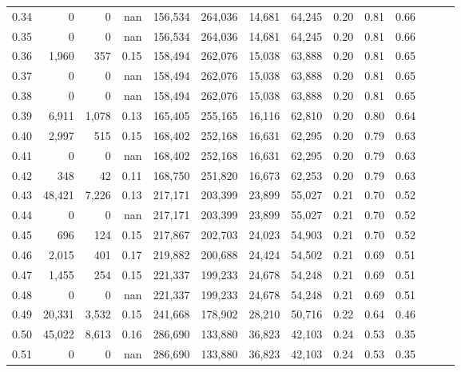 \begin{tabular}{rrrrrrrrrrrrrr}
0.34 &       0 &      0 &   nan &  156,534 &  264,036 &  14,681 &  64,245 &  0.20 &  0.81 &      0.66 \\
0.35 &       0 &      0 &   nan &  156,534 &  264,036 &  14,681 &  64,245 &  0.20 &  0.81 &      0.66 \\
0.36 &   1,960 &    357 &  0.15 &  158,494 &  262,076 &  15,038 &  63,888 &  0.20 &  0.81 &      0.65 \\
0.37 &       0 &      0 &   nan &  158,494 &  262,076 &  15,038 &  63,888 &  0.20 &  0.81 &      0.65 \\
0.38 &       0 &      0 &   nan &  158,494 &  262,076 &  15,038 &  63,888 &  0.20 &  0.81 &      0.65 \\
0.39 &   6,911 &  1,078 &  0.13 &  165,405 &  255,165 &  16,116 &  62,810 &  0.20 &  0.80 &      0.64 \\
0.40 &   2,997 &    515 &  0.15 &  168,402 &  252,168 &  16,631 &  62,295 &  0.20 &  0.79 &      0.63 \\
0.41 &       0 &      0 &   nan &  168,402 &  252,168 &  16,631 &  62,295 &  0.20 &  0.79 &      0.63 \\
0.42 &     348 &     42 &  0.11 &  168,750 &  251,820 &  16,673 &  62,253 &  0.20 &  0.79 &      0.63 \\
0.43 &  48,421 &  7,226 &  0.13 &  217,171 &  203,399 &  23,899 &  55,027 &  0.21 &  0.70 &      0.52 \\
0.44 &       0 &      0 &   nan &  217,171 &  203,399 &  23,899 &  55,027 &  0.21 &  0.70 &      0.52 \\
0.45 &     696 &    124 &  0.15 &  217,867 &  202,703 &  24,023 &  54,903 &  0.21 &  0.70 &      0.52 \\
0.46 &   2,015 &    401 &  0.17 &  219,882 &  200,688 &  24,424 &  54,502 &  0.21 &  0.69 &      0.51 \\
0.47 &   1,455 &    254 &  0.15 &  221,337 &  199,233 &  24,678 &  54,248 &  0.21 &  0.69 &      0.51 \\
0.48 &       0 &      0 &   nan &  221,337 &  199,233 &  24,678 &  54,248 &  0.21 &  0.69 &      0.51 \\
0.49 &  20,331 &  3,532 &  0.15 &  241,668 &  178,902 &  28,210 &  50,716 &  0.22 &  0.64 &      0.46 \\
0.50 &  45,022 &  8,613 &  0.16 &  286,690 &  133,880 &  36,823 &  42,103 &  0.24 &  0.53 &      0.35 \\
0.51 &       0 &      0 &   nan &  286,690 &  133,880 &  36,823 &  42,103 &  0.24 &  0.53 &      0.35 \\

\end{tabular}
